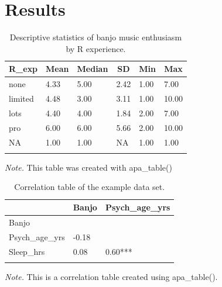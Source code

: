 \documentclass[english,man]{apa6}
\theoremstyle{definition}
\theoremstyle{definition}
\theoremstyle{definition}
\theoremstyle{remark}
\begin{document}
\section{Results}\label{results}

\begin{table}[tbp]
\begin{center}
\begin{threeparttable}
\caption{\label{tab:Banjo-by-experience}Descriptive statistics of banjo music enthusiasm by R experience.}
\begin{tabular}{llllll}
\toprule
R\_exp & \multicolumn{1}{c}{Mean} & \multicolumn{1}{c}{Median} & \multicolumn{1}{c}{SD} & \multicolumn{1}{c}{Min} & \multicolumn{1}{c}{Max}\\
\midrule
none & 4.33 & 5.00 & 2.42 & 1.00 & 7.00\\
limited & 4.48 & 3.00 & 3.11 & 1.00 & 10.00\\
lots & 4.40 & 4.00 & 1.84 & 2.00 & 7.00\\
pro & 6.00 & 6.00 & 5.66 & 2.00 & 10.00\\
NA & 1.00 & 1.00 & NA & 1.00 & 1.00\\
\bottomrule
\addlinespace
\end{tabular}
\begin{tablenotes}[para]
\textit{Note.} This table was created with apa\_table()
\end{tablenotes}
\end{threeparttable}
\end{center}
\end{table}

\begin{table}[tbp]
\begin{center}
\begin{threeparttable}
\caption{\label{tab:apa-corr-table}Correlation table of the example data set.}
\begin{tabular}{lll}
\toprule
 & \multicolumn{1}{c}{Banjo} & \multicolumn{1}{c}{Psych\_age\_yrs}\\
\midrule
Banjo &  & \\
Psych\_age\_yrs & -0.18 & \\
Sleep\_hrs & 0.08 & 0.60***\\
\bottomrule
\addlinespace
\end{tabular}
\begin{tablenotes}[para]
\textit{Note.} This is a correlation table created using apa\_table().
\end{tablenotes}
\end{threeparttable}
\end{center}
\end{table}
\end{document}
